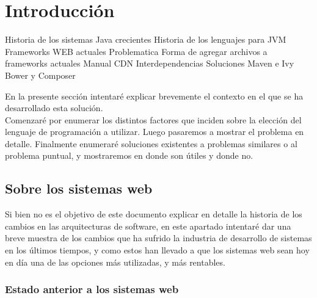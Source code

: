\section{Introducción}
\label{sec:intro}

Historia de los sistemas Java crecientes
Historia de los lenguajes para JVM
Frameworks WEB actuales
Problematica
Forma de agregar archivos a frameworks actuales
Manual
CDN
Interdependencias
Soluciones Maven e Ivy
Bower y Composer

En la presente sección intentaré explicar brevemente el contexto en el que se ha
desarrollado esta solución.\\
Comenzaré por enumerar los distintos factores que inciden sobre la elección del lenguaje
de programación a utilizar. Luego pasaremos a mostrar el problema en detalle. Finalmente
enumeraré soluciones existentes a problemas similares o al problema puntual, y mostraremos
en donde son útiles y donde no.

\subsection{Sobre los sistemas web}
\label{subsec:intro:about_web}

Si bien no es el objetivo de este documento explicar en detalle la historia de los cambios
en las arquitecturas de software, en este apartado intentaré dar una breve muestra de los
cambios que ha sufrido la industria de desarrollo de sistemas en los últimos tiempos, y
como estos han llevado a que los sistemas web sean hoy en día una de las opciones más
utilizadas, y más rentables.

\subsubsection{Estado anterior a los sistemas web}
\label{subsubsec:intro:about_web:previous_pc}

